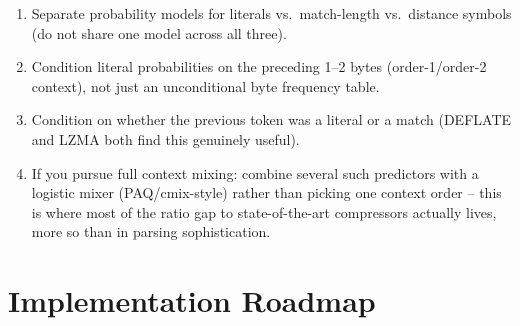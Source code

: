 \documentclass[11pt]{article}
\begin{document}
\begin{enumerate}
  \item Separate probability models for literals vs.\ match-length vs.\ distance
  symbols (do not share one model across all three).
  \item Condition literal probabilities on the preceding 1--2 bytes (order-1/order-2
  context), not just an unconditional byte frequency table.
  \item Condition on whether the previous token was a literal or a match (DEFLATE and
  LZMA both find this genuinely useful).
  \item If you pursue full context mixing: combine several such predictors with a
  logistic mixer (PAQ/cmix-style) rather than picking one context order -- this is where
  most of the ratio gap to state-of-the-art compressors actually lives, more so than in
  parsing sophistication.
\end{enumerate}

\section{Implementation Roadmap}
\label{sec:roadmap}
\end{document}
